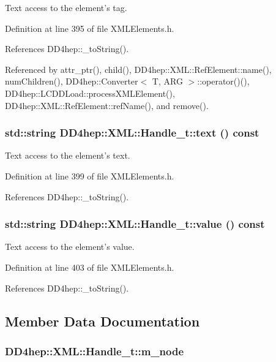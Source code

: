 Text access to the element's tag. 

Definition at line 395 of file XMLElements.h.

References DD4hep::\_\-toString().

Referenced by attr\_\-ptr(), child(), DD4hep::XML::RefElement::name(), numChildren(), DD4hep::Converter$<$ T, ARG $>$::operator()(), DD4hep::LCDDLoad::processXMLElement(), DD4hep::XML::RefElement::refName(), and remove().\hypertarget{class_d_d4hep_1_1_x_m_l_1_1_handle__t_a3db3aa16d50df894c2942f2ddf7efa48}{
\subsubsection[{text}]{\setlength{\rightskip}{0pt plus 5cm}std::string DD4hep::XML::Handle\_\-t::text () const}}
\label{class_d_d4hep_1_1_x_m_l_1_1_handle__t_a3db3aa16d50df894c2942f2ddf7efa48}


Text access to the element's text. 

Definition at line 399 of file XMLElements.h.

References DD4hep::\_\-toString().\hypertarget{class_d_d4hep_1_1_x_m_l_1_1_handle__t_a6561b8a5429179b0d2c5d7f02e5cf3be}{
\subsubsection[{value}]{\setlength{\rightskip}{0pt plus 5cm}std::string DD4hep::XML::Handle\_\-t::value () const}}
\label{class_d_d4hep_1_1_x_m_l_1_1_handle__t_a6561b8a5429179b0d2c5d7f02e5cf3be}


Text access to the element's value. 

Definition at line 403 of file XMLElements.h.

References DD4hep::\_\-toString().

\subsection{Member Data Documentation}
\hypertarget{class_d_d4hep_1_1_x_m_l_1_1_handle__t_afa133bf6ff332a64464594429061f036}{
\subsubsection[{m\_\-node}]{ {\bf DD4hep::XML::Handle\_\-t::m\_\-node}}}
\label{class_d_d4hep_1_1_x_m_l_1_1_handle__t_afa133bf6ff332a64464594429061f036}


